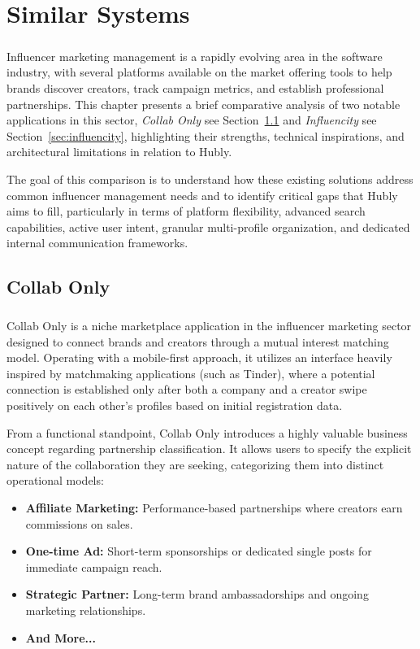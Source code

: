 \chapter{Similar Systems} \label{ch:similar_systems}

\paragraph{}Influencer marketing management is a rapidly evolving area in the software industry, with several platforms available on the market offering tools to help brands discover creators, track campaign metrics, and establish professional partnerships. This chapter presents a brief comparative analysis of two notable applications in this sector, \textit{Collab Only} see Section~\ref{sec:collab_only} and \textit{Influencity} see Section~\ref{sec:influencity}, highlighting their strengths, technical inspirations, and architectural limitations in relation to Hubly.

The goal of this comparison is to understand how these existing solutions address common influencer management needs and to identify critical gaps that Hubly aims to fill, particularly in terms of platform flexibility, advanced search capabilities, active user intent, granular multi-profile organization, and dedicated internal communication frameworks.

\section{Collab Only}
\label{sec:collab_only}
\paragraph{}Collab Only is a niche marketplace application in the influencer marketing sector designed to connect brands and creators through a mutual interest matching model. Operating with a mobile-first approach, it utilizes an interface heavily inspired by matchmaking applications (such as Tinder), where a potential connection is established only after both a company and a creator swipe positively on each other's profiles based on initial registration data.

From a functional standpoint, Collab Only introduces a highly valuable business concept regarding partnership classification. It allows users to specify the explicit nature of the collaboration they are seeking, categorizing them into distinct operational models:
\begin{itemize}
    \item \textbf{Affiliate Marketing:} Performance-based partnerships where creators earn commissions on sales.
    \item \textbf{One-time Ad:} Short-term sponsorships or dedicated single posts for immediate campaign reach.
    \item \textbf{Strategic Partner:} Long-term brand ambassadorships and ongoing marketing relationships.
    \item \textbf{And More...}

\end{itemize}

